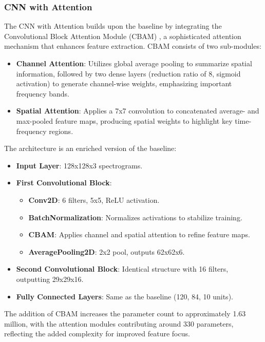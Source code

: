\documentclass[12pt]{article}
\begin{document}
\subsubsection{CNN with Attention}
The CNN with Attention builds upon the baseline by integrating the Convolutional Block Attention Module (CBAM) \cite{cbam_paper}, a sophisticated attention mechanism that enhances feature extraction. CBAM consists of two sub-modules:
\begin{itemize}
    \item \textbf{Channel Attention}: Utilizes global average pooling to summarize spatial information, followed by two dense layers (reduction ratio of 8, sigmoid activation) to generate channel-wise weights, emphasizing important frequency bands.
    \item \textbf{Spatial Attention}: Applies a 7x7 convolution to concatenated average- and max-pooled feature maps, producing spatial weights to highlight key time-frequency regions.
\end{itemize}
The architecture is an enriched version of the baseline:
\begin{itemize}
    \item \textbf{Input Layer}: 128x128x3 spectrograms.
    \item \textbf{First Convolutional Block}:
        \begin{itemize}
            \item \textbf{Conv2D}: 6 filters, 5x5, ReLU activation.
            \item \textbf{BatchNormalization}: Normalizes activations to stabilize training.
            \item \textbf{CBAM}: Applies channel and spatial attention to refine feature maps.
            \item \textbf{AveragePooling2D}: 2x2 pool, outputs 62x62x6.
        \end{itemize}
    \item \textbf{Second Convolutional Block}: Identical structure with 16 filters, outputting 29x29x16.
    \item \textbf{Fully Connected Layers}: Same as the baseline (120, 84, 10 units).
\end{itemize}
The addition of CBAM increases the parameter count to approximately 1.63 million, with the attention modules contributing around 330 parameters, reflecting the added complexity for improved feature focus.
\end{document}

